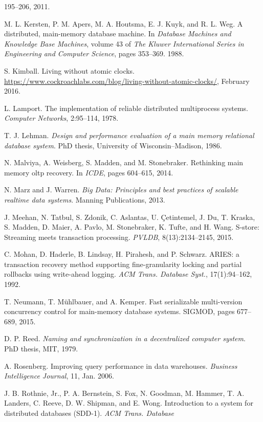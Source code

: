 \documentclass[a4paper,12pt,notitlepage,twoside,openright]{article}
\begin{document}
\begin{enumerate}[label={[}\arabic*{]}]
  195--206, 2011.
\item
  M. L. Kersten, P. M. Apers, M. A. Houtsma, E. J. Kuyk, and R. L. Weg.
  A distributed, main-memory database machine. In \emph{Database
  Machines and Knowledge Base Machines}, volume 43 of \emph{The Kluwer
  International Series in Engineering and Computer Science}, pages
  353--369. 1988.
\item
  S. Kimball. Living without atomic clocks.
  \url{https://www.cockroachlabs.com/blog/living-without-atomic-clocks/},
  February 2016.
\item
  L. Lamport. The implementation of reliable distributed multiprocess
  systems. \emph{Computer Networks}, 2:95--114, 1978.
\item
  T. J. Lehman. \emph{Design and performance evaluation of a main memory
  relational database system}. PhD thesis, University of
  Wisconsin--Madison, 1986.
\item
  N. Malviya, A. Weisberg, S. Madden, and M. Stonebraker. Rethinking
  main memory oltp recovery. In \emph{ICDE}, pages 604--615, 2014.
\item
  N. Marz and J. Warren. \emph{Big Data: Principles and best practices
  of scalable realtime data systems}. Manning Publications, 2013.
\item
  J. Meehan, N. Tatbul, S. Zdonik, C. Aslantas,
U. \c{C}etintemel, J. Du, T. Kraska, S. Madden, D. Maier,
A. Pavlo, M. Stonebraker, K. Tufte, and H. Wang. S-store: Streaming
meets transaction processing.
\emph{PVLDB}, 8(13):2134--2145, 2015.
\item
  C. Mohan, D. Haderle, B. Lindsay, H. Pirahesh, and P. Schwarz. ARIES:
  a transaction recovery method supporting fine-granularity locking and
  partial rollbacks using write-ahead logging. \emph{ACM Trans. Database
  Syst.}, 17(1):94--162, 1992.
\item
  T. Neumann, T. M\"{u}hlbauer, and A. Kemper. Fast serializable
  multi-version concurrency control for main-memory database systems.
  SIGMOD, pages 677--689, 2015.
\item
  D. P. Reed. \emph{Naming and synchronization in a decentralized
  computer system}. PhD thesis, MIT, 1979.
\item
  A. Rosenberg. Improving query performance in data warehouses.
  \emph{Business Intelligence Journal}, 11, Jan. 2006.
\item
  J. B. Rothnie, Jr., P. A. Bernstein, S. Fox, N. Goodman, M. Hammer, T.
  A. Landers, C. Reeve, D. W. Shipman, and E. Wong. Introduction to a
  system for distributed databases (SDD-1). \emph{ACM Trans. Database
}
\end{enumerate}
\end{document}
